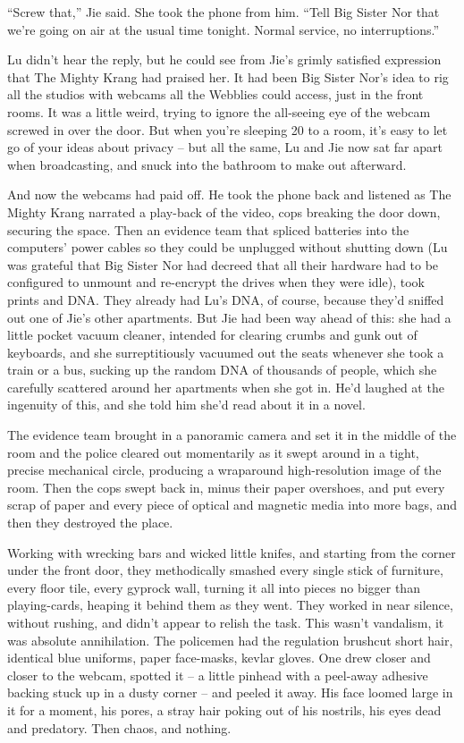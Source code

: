 ``Screw that,'' Jie said. She took the phone from him. ``Tell Big
Sister Nor that we're going on air at the usual time tonight.
Normal service, no interruptions.''

Lu didn't hear the reply, but he could see from Jie's grimly
satisfied expression that The Mighty Krang had praised her. It had
been Big Sister Nor's idea to rig all the studios with webcams all
the Webblies could access, just in the front rooms. It was a little
weird, trying to ignore the all-seeing eye of the webcam screwed in
over the door. But when you're sleeping 20 to a room, it's easy to
let go of your ideas about privacy -- but all the same, Lu and Jie
now sat far apart when broadcasting, and snuck into the bathroom to
make out afterward.

And now the webcams had paid off. He took the phone back and
listened as The Mighty Krang narrated a play-back of the video,
cops breaking the door down, securing the space. Then an evidence
team that spliced batteries into the computers' power cables so
they could be unplugged without shutting down (Lu was grateful that
Big Sister Nor had decreed that all their hardware had to be
configured to unmount and re-encrypt the drives when they were
idle), took prints and DNA. They already had Lu's DNA, of course,
because they'd sniffed out one of Jie's other apartments. But Jie
had been way ahead of this: she had a little pocket vacuum cleaner,
intended for clearing crumbs and gunk out of keyboards, and she
surreptitiously vacuumed out the seats whenever she took a train or
a bus, sucking up the random DNA of thousands of people, which she
carefully scattered around her apartments when she got in. He'd
laughed at the ingenuity of this, and she told him she'd read about
it in a novel.

The evidence team brought in a panoramic camera and set it in the
middle of the room and the police cleared out momentarily as it
swept around in a tight, precise mechanical circle, producing a
wraparound high-resolution image of the room. Then the cops swept
back in, minus their paper overshoes, and put every scrap of paper
and every piece of optical and magnetic media into more bags, and
then they destroyed the place.

Working with wrecking bars and wicked little knifes, and starting
from the corner under the front door, they methodically smashed
every single stick of furniture, every floor tile, every gyprock
wall, turning it all into pieces no bigger than playing-cards,
heaping it behind them as they went. They worked in near silence,
without rushing, and didn't appear to relish the task. This wasn't
vandalism, it was absolute annihilation. The policemen had the
regulation brushcut short hair, identical blue uniforms, paper
face-masks, kevlar gloves. One drew closer and closer to the
webcam, spotted it -- a little pinhead with a peel-away adhesive
backing stuck up in a dusty corner -- and peeled it away. His face
loomed large in it for a moment, his pores, a stray hair poking out
of his nostrils, his eyes dead and predatory. Then chaos, and
nothing.

